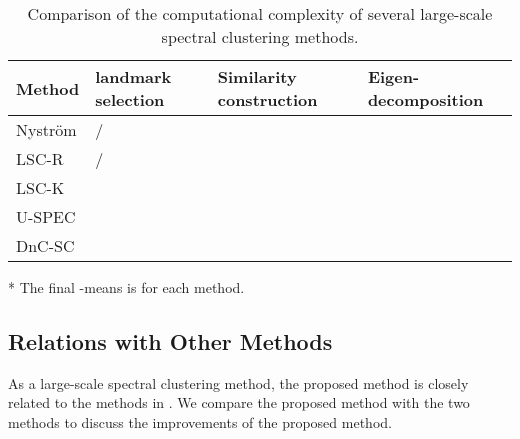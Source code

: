 \documentclass[a4paper,fleqn]{cas-dc}
\begin{document}
\begin{table}\centering
  \caption{Comparison of the computational complexity of several large-scale spectral clustering methods.}
  \label{table:cmp_complexity}
  \begin{threeparttable}
    \begin{tabular}{p{1.4cm}<{\centering}p{1.65cm}<{\centering}p{1.6cm}<{\centering}p{2.435cm}<{\centering}}
      \toprule
      Method                                 & landmark selection & Similarity construction  & Eigen-decomposition \\
      \midrule
Nystr\"{o}m  & /                        &                &          \\
      LSC-R  & /                        &                &        \\
      LSC-K &                 &                &        \\
      U-SPEC           &                &  &     \\
      DnC-SC                                 &                  &                &     \\
      \bottomrule
    \end{tabular}
    \begin{tablenotes}
      \item[*] The final -means is  for each method.
    \end{tablenotes}
  \end{threeparttable}
\end{table}


\subsection{Relations with Other Methods}
As a large-scale spectral clustering method, the proposed method is closely related to the methods in \cite{cai2014large, huang2019ultra}. 
We compare the proposed method with the two methods to discuss the improvements of the proposed method. 
\end{document}
